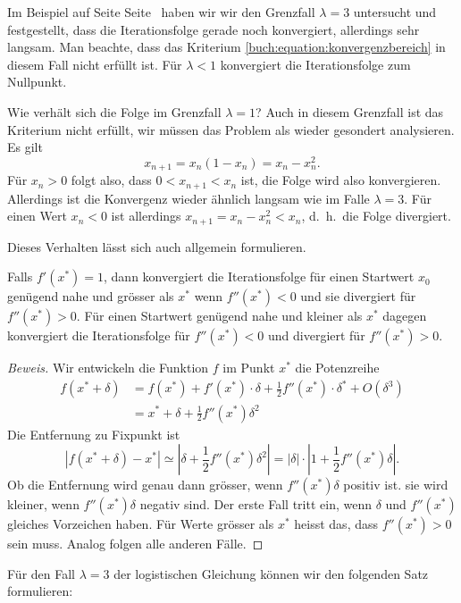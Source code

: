 Im Beispiel auf Seite Seite~\pageref{buch:beispiel:logistisch3} haben wir
wir den Grenzfall $\lambda=3$ untersucht und festgestellt, dass die
Iterationsfolge gerade noch konvergiert, allerdings sehr langsam.
Man beachte, dass das Kriterium \eqref{buch:equation:konvergenzbereich}
in diesem Fall nicht erfüllt ist.
Für $\lambda<1$ konvergiert die Iterationsfolge zum Nullpunkt.

Wie verhält sich die Folge im Grenzfall $\lambda=1$?
Auch in diesem Grenzfall ist das Kriterium nicht erfüllt, wir müssen
das Problem als wieder gesondert analysieren.
Es gilt
\[
x_{n+1} = x_n(1-x_n) = x_n-x_n^2.
\]
Für $x_n>0$ folgt also, dass $0<x_{n+1} < x_n$ ist, die Folge wird also
konvergieren.
Allerdings ist die Konvergenz wieder ähnlich langsam wie im Falle
$\lambda=3$.
Für einen Wert $x_n<0$ ist allerdings $x_{n+1} = x_n - x_n^2 < x_n$,
d.~h.~die Folge divergiert.

Dieses Verhalten lässt sich auch allgemein formulieren.

\begin{satz}
\label{buch:satz:kritischekonvergenz}
Falls $f'(x^*)=1$, dann konvergiert die Iterationsfolge für einen
Startwert $x_0$ genügend nahe und grösser als $x^*$ wenn $f''(x^*)<0$ 
und sie divergiert für $f''(x^*)>0$.
Für einen Startwert genügend nahe und kleiner als $x^*$ dagegen
konvergiert die Iterationsfolge für $f''(x^*)<0$ und divergiert für
$f''(x^*)>0$.
\end{satz}

\begin{proof}[Beweis]
Wir entwickeln die Funktion $f$ im Punkt $x^*$ die Potenzreihe
\begin{align*}
f(x^*+\delta)
&=
f(x^*) + f'(x^*)\cdot\delta + \frac12f''(x^*)\cdot \delta^* + O(\delta^3)
\\
&=
x^* + \delta + \frac12f''(x^*)\delta^2
\end{align*}
Die Entfernung zu Fixpunkt ist
\[
|f(x^*+\delta)-x^*|
\simeq
|\delta  + \frac12f''(x^*)\delta^2|
=
|\delta|\cdot |1 + \frac12f''(x^*)\delta|.
\]
Ob die Entfernung wird genau dann grösser, wenn $f''(x^*)\delta$ positiv ist.
sie wird kleiner, wenn $f''(x^*)\delta$ negativ sind.
Der erste Fall tritt ein, wenn $\delta$ und $f''(x^*)$ gleiches
Vorzeichen haben.
Für Werte grösser als $x^*$ heisst das, dass $f''(x^*)>0$ sein muss.
Analog folgen alle anderen Fälle.
\end{proof}

Für den Fall $\lambda=3$ der logistischen Gleichung können wir den
folgenden Satz formulieren:

